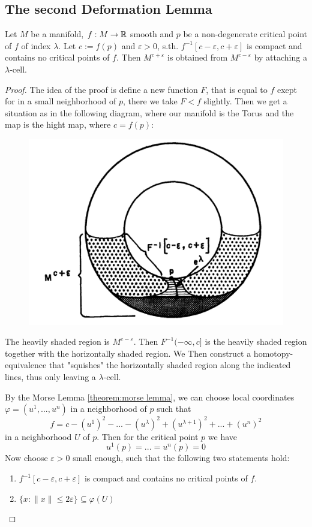 \subsection{The second Deformation Lemma}

\begin{theorem}
    \label{theorem:2nd deformation lemma}
    Let $M$ be a manifold, $f: M \rightarrow {\mathbb R}$ smooth and $p$ be a 
    non-degenerate critical point of $f$ of index $\lambda$. Let $c := f(p)$ and 
    $\varepsilon > 0$, s.th. $f^{-1}[c-\varepsilon, c+\varepsilon]$ is compact 
    and contains no critical points of $f$. Then $M^{c+\varepsilon}$ is obtained 
    from $M^{c-\varepsilon}$ by attaching a $\lambda$-cell.
 \end{theorem}
 
 \begin{proof}
    The idea of the proof is define a new function $F$, that is equal to $f$
    exept for in a small neighborhood of $p$, there we take $F < f$ slightly. 
    Then we get a situation as in the following diagram, where our manifold is
    the Torus and the map is the hight map, where $c = f(p)$:
 
    \begin{figure}[H]
       \centering
       \includegraphics[width=0.5\linewidth]{resources/Mil-Diagram4.png}
       \label{fig:mil-diagram4}
    \end{figure}
 
    The heavily shaded region is $M^{c-\varepsilon}$. Then $F^{-1}(-\infty, c]$ is
    the heavily shaded region together with the horizontally shaded region. We Then
    construct a homotopy-equivalence that "squishes" the horizontally shaded region
    along the indicated lines, thus only leaving a $\lambda$-cell.
 
    By the Morse Lemma \ref{theorem:morse lemma}, we can choose local coordinates
    $\varphi = (u^1, ..., u^n)$ in a neighborhood of $p$ such that 
    \[ f = c -  (u^1)^2 - ... - (u^{\lambda})^2 + (u^{\lambda + 1})^2 + ... + (u^n)^2 \]
    in a neighborhood $U$ of $p$. Then for the critical point $p$ we have
    \[ u^1(p) = ... = u^n(p) = 0 \]
    Now choose $\varepsilon > 0$ small enough, such that the following two 
    statements hold:
    \begin{enumerate}
       \item $f^{-1}[c - \varepsilon, c + \varepsilon]$ is compact and contains
          no critical points of $f$.
       \item $\{ x: \lVert x \rVert \leq 2\varepsilon \} \subseteq \varphi(U)$
    \end{enumerate}
 

\end{proof}
